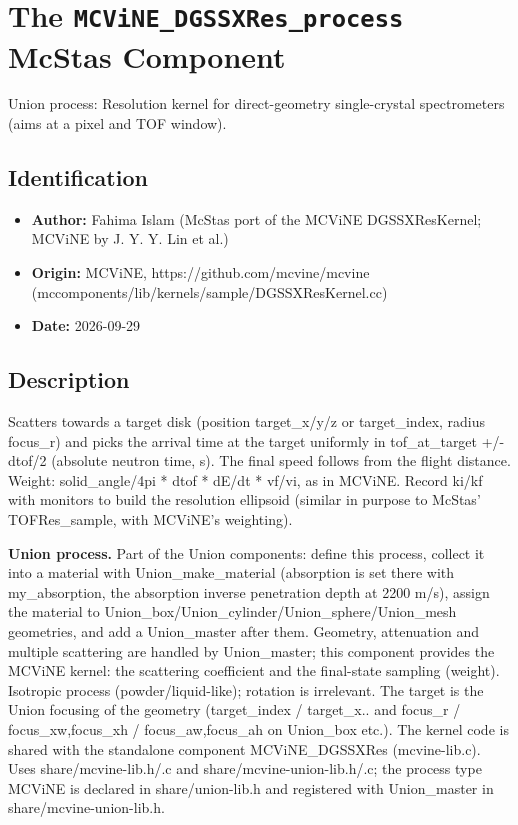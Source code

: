 \section{The \texttt{MCViNE\_DGSSXRes\_process} McStas Component}
Union process: Resolution kernel for direct-geometry single-crystal spectrometers (aims at a pixel and TOF window).

\subsection*{Identification}
\begin{itemize}
  \item \textbf{Author:} Fahima Islam (McStas port of the MCViNE DGSSXResKernel; MCViNE by J. Y. Y. Lin et al.)
  \item \textbf{Origin:} MCViNE, https://github.com/mcvine/mcvine (mccomponents/lib/kernels/sample/DGSSXResKernel.cc)
  \item \textbf{Date:} 2026-09-29
\end{itemize}

\subsection*{Description}
Scatters towards a target disk (position target\_x/y/z or target\_index, radius focus\_r) and picks the arrival time at the target uniformly in tof\_at\_target +/- dtof/2 (absolute neutron time, s). The final speed follows from the flight distance. Weight: solid\_angle/4pi * dtof * dE/dt * vf/vi, as in MCViNE. Record ki/kf with monitors to build the resolution ellipsoid (similar in purpose to McStas' TOFRes\_sample, with MCViNE's weighting).

\textbf{Union process.} Part of the Union components: define this process, collect it into a material with Union\_make\_material (absorption is set there with my\_absorption, the absorption inverse penetration depth at 2200 m/s), assign the material to Union\_box/Union\_cylinder/Union\_sphere/Union\_mesh geometries, and add a Union\_master after them. Geometry, attenuation and multiple scattering are handled by Union\_master; this component provides the MCViNE kernel: the scattering coefficient and the final-state sampling (weight). Isotropic process (powder/liquid-like); rotation is irrelevant. The target is the Union focusing of the geometry (target\_index / target\_x.. and focus\_r / focus\_xw,focus\_xh / focus\_aw,focus\_ah on Union\_box etc.). The kernel code is shared with the standalone component MCViNE\_DGSSXRes (mcvine-lib.c). Uses share/mcvine-lib.h/.c and share/mcvine-union-lib.h/.c; the process type MCViNE is declared in share/union-lib.h and registered with Union\_master in share/mcvine-union-lib.h.

